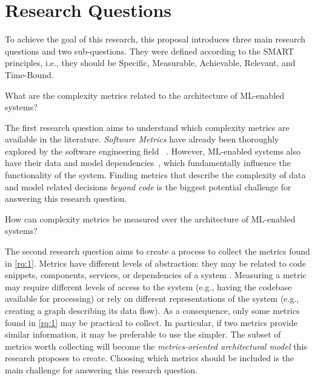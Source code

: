   \section{Research Questions}
  \label{sec:research_questions}

    To achieve the goal of this research, this proposal introduces three
    main research questions and two sub-questions. They were defined
    according to the SMART principles, i.e., they should be Specific,
    Measurable, Achievable, Relevant, and Time-Bound.

    \begin{researchquestion}
      What are the complexity metrics related to the architecture of
      ML-enabled systems?
    \end{researchquestion}

    The first research question aims to understand which complexity
    metrics are available in the literature. \emph{Software Metrics}
    have already been thoroughly explored by the software engineering field%
    ~\parencite{Fenton2014SoftwareEdition}. However, ML-enabled systems also
    have their data and model dependencies~\parencite{Sato2005RNAFields},
    which fundamentally influence the functionality of the system.
    Finding metrics that describe the complexity of data and model
    related decisions \emph{beyond code} is the biggest potential
    challenge for answering this research question.

    \begin{researchquestion}
      How can complexity metrics be measured over the architecture of
      ML-enabled systems?
    \end{researchquestion}

    The second research question aims to create a process to collect
    the metrics found in \cref{rq:1}.
    Metrics have different levels of abstraction: they may be related
    to code snippets, components, services, or dependencies of a system
    \parencite{Fenton2014SoftwareEdition}. Measuring a metric may require
    different levels of access to the system (e.g., having the codebase
    available for processing) or rely on different representations of
    the system (e.g., creating a graph describing its data flow).
    As a consequence, only some metrics found in \cref{rq:1} may
    be practical to collect. In particular, if two metrics provide
    similar information, it may be preferable to use the simpler.
    The subset of metrics worth collecting will become the
    \emph{metrics-oriented architectural model} this research
    proposes to create. Choosing which metrics should be included
    is the main challenge for answering this research question.
    
